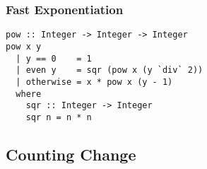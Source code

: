 \documentclass[dvipsnames]{beamer}
\theoremstyle{plain}
\begin{document}
\begin{frame}[fragile]
  \frametitle{Fast Exponentiation}

  \begin{lstlisting}
pow :: Integer -> Integer -> Integer
pow x y
  | y == 0    = 1
  | even y    = sqr (pow x (y `div` 2))
  | otherwise = x * pow x (y - 1)
  where
    sqr :: Integer -> Integer
    sqr n = n * n
  \end{lstlisting}
\end{frame}

%
%
%
%
%

\subsection{Counting Change}

\lstset{deletekeywords=next}
\end{document}
